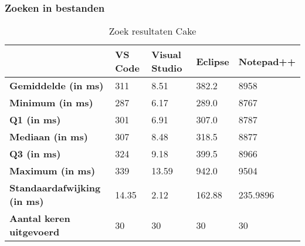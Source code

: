 \subsubsection{Zoeken in bestanden}

\begin{table}[h]
	\centering
	\begin{tabular}{ l l l l l }
		\hline
		                                    & \textbf{VS Code} & \textbf{Visual Studio} & \textbf{Eclipse} & \textbf{Notepad++} \\
		\hline
		\textbf{Gemiddelde (in ms)}         & 311              & 8.51                   & 382.2            & 8958               \\[1ex]

		\textbf{Minimum (in ms) }           & 287              & 6.17                   & 289.0            & 8767               \\
		\textbf{Q1 (in ms)}                 & 301              & 6.91                   & 307.0            & 8787               \\
		\textbf{Mediaan (in ms)}            & 307              & 8.48                   & 318.5            & 8877               \\
		\textbf{Q3 (in ms)}                 & 324              & 9.18                   & 399.5            & 8966               \\
		\textbf{Maximum (in ms)}            & 339              & 13.59                  & 942.0            & 9504               \\[1ex]

		\textbf{Standaardafwijking (in ms)} & 14.35            & 2.12                   & 162.88           & 235.9896           \\
		\textbf{Aantal keren uitgevoerd}    & 30               & 30                     & 30               & 30                 \\
		\hline
	\end{tabular}
	\caption{Zoek resultaten Cake}
	\label{tab:resultatenSearchCake}
\end{table}

